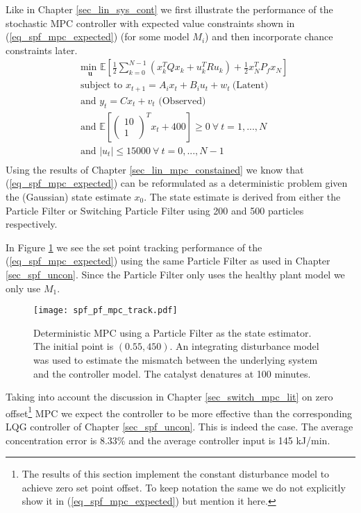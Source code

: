Like in Chapter \ref{sec_lin_sys_cont} we first illustrate the performance of the stochastic MPC controller with expected value constraints shown in (\ref{eq_spf_mpc_expected}) (for some model $M_i$) and then incorporate chance constraints later.
\begin{equation}
\begin{aligned}
&\underset{\mathbf{u}}{\text{min }} \mathbb{E}\left[ \frac{1}{2}\sum_{k=0}^{N-1} \left( x_k^TQx_k + u_k^TRu_k \right) + \frac{1}{2}x_N^TP_fx_N \right] \\
& \text{subject to } x_{t+1}=A_ix_t+B_iu_t + w_t~\text{(Latent)} \\
& \text{and } y_{t}= Cx_t + v_t \text{ (Observed)}\\
& \text{and } \mathbb{E}[\begin{pmatrix}
10 \\ 1
\end{pmatrix}^Tx_t + 400] \geq 0 ~\forall ~t=1,...,N \\
& \text{and } |u_t| \leq 15000 ~\forall ~t=0,...,N-1\\
\end{aligned}
\label{eq_spf_mpc_expected}
\end{equation} 
Using the results of Chapter \ref{sec_lin_mpc_constained} we know that (\ref{eq_spf_mpc_expected}) can be reformulated as a deterministic problem given the (Gaussian) state estimate $x_0$. The state estimate is derived from either the Particle Filter or Switching Particle Filter using 200 and 500 particles respectively.

In Figure \ref{fig_spf_pf_mpc_track} we see the set point tracking performance of the (\ref{eq_spf_mpc_expected}) using the same Particle Filter as used in Chapter \ref{sec_spf_uncon}. Since the Particle Filter only uses the healthy plant model we only use $M_1$. 
\begin{figure}[H] 
\centering
\texttt{[image: spf\_pf\_mpc\_track.pdf]}
\caption{Deterministic MPC using a Particle Filter as the state estimator. The initial point is $(0.55, 450)$. An integrating disturbance model was used to estimate the mismatch between the underlying system and the controller model. The catalyst denatures at 100 minutes.}
\label{fig_spf_pf_mpc_track}
\end{figure}
Taking into account the discussion in Chapter \ref{sec_switch_mpc_lit} on zero offset\footnote{The results of this section implement the constant disturbance model to achieve zero set point offset. To keep notation the same we do not explicitly show it in (\ref{eq_spf_mpc_expected}) but mention it here.} MPC we expect the controller to be more effective than the corresponding LQG controller of Chapter \ref{sec_spf_uncon}. This is indeed the case. The average concentration error is 8.33\% and the average controller input is 145 kJ/min. 

